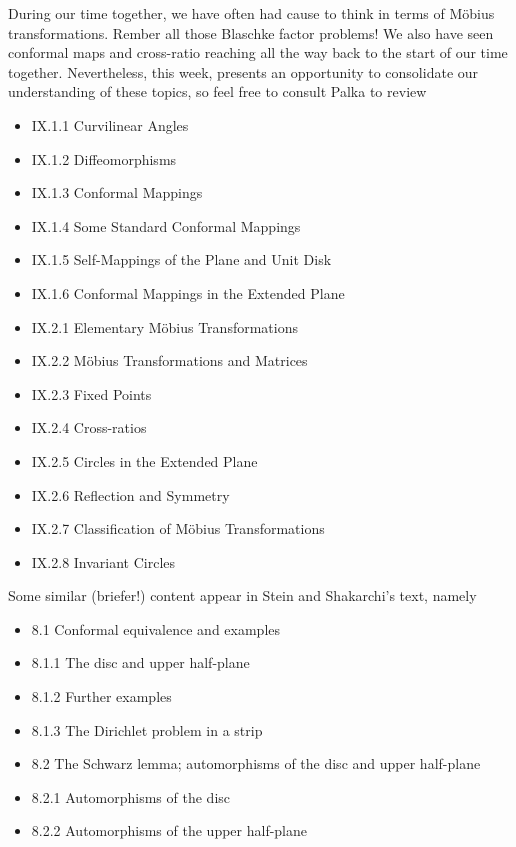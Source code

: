 \documentclass{homework}
\begin{document}
During our time together, we have often had cause to think in terms of
M\"obius transformations.  Rember all those Blaschke factor problems!
We also have seen conformal maps and cross-ratio reaching all the way
back to the start of our time together.  Nevertheless, this week,
presents an opportunity to consolidate our understanding of these
topics, so feel free to consult Palka to review
\begin{itemize}
\item IX.1.1 Curvilinear Angles
\item IX.1.2 Diffeomorphisms
\item IX.1.3 Conformal Mappings
\item IX.1.4 Some Standard Conformal Mappings
\item IX.1.5 Self-Mappings of the Plane and Unit Disk
\item IX.1.6 Conformal Mappings in the Extended Plane
\item IX.2.1 Elementary M\"obius Transformations
\item IX.2.2 M\"obius Transformations and Matrices
\item IX.2.3 Fixed Points
\item IX.2.4 Cross-ratios
\item IX.2.5 Circles in the Extended Plane
\item IX.2.6 Reflection and Symmetry
\item IX.2.7 Classification of M\"obius Transformations
\item IX.2.8 Invariant Circles
\end{itemize}
Some similar (briefer!) content appear in Stein and Shakarchi's text, namely
\begin{itemize}
\item 8.1 Conformal equivalence and examples
\item 8.1.1 The disc and upper half-plane
\item 8.1.2 Further examples
\item 8.1.3 The Dirichlet problem in a strip
\item 8.2 The Schwarz lemma; automorphisms of the disc and upper half-plane
\item 8.2.1 Automorphisms of the disc
\item 8.2.2 Automorphisms of the upper half-plane
\end{itemize}
\end{document}
